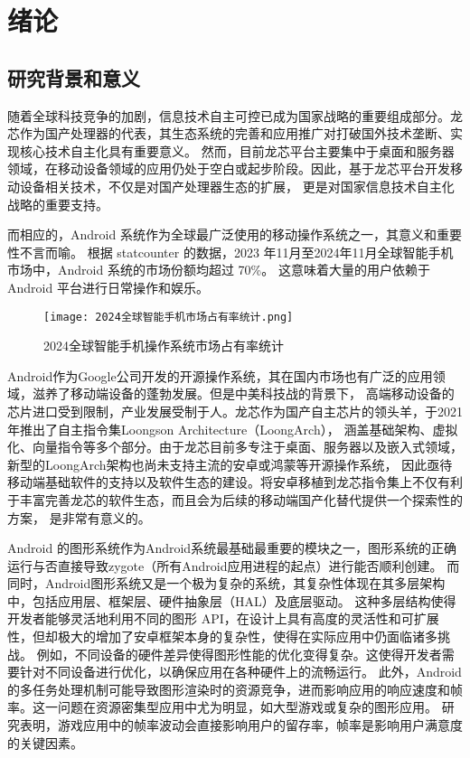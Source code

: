
\chapter{绪论}

\section{研究背景和意义}

随着全球科技竞争的加剧，信息技术自主可控已成为国家战略的重要组成部分。龙芯作为国产处理器的代表，其生态系统的完善和应用推广对打破国外技术垄断、实现核心技术自主化具有重要意义。
然而，目前龙芯平台主要集中于桌面和服务器领域，在移动设备领域的应用仍处于空白或起步阶段。因此，基于龙芯平台开发移动设备相关技术，不仅是对国产处理器生态的扩展，
更是对国家信息技术自主化战略的重要支持。

而相应的，Android 系统作为全球最广泛使用的移动操作系统之一，其意义和重要性不言而喻。
根据 statcounter 的数据，2023 年11月至2024年11月全球智能手机市场中，Android 系统的市场份额均超过 70\%\cite{MobileMarket}。
这意味着大量的用户依赖于 Android 平台进行日常操作和娱乐。
\begin{figure}[h]
    \centering
    \texttt{[image: 2024全球智能手机市场占有率统计.png]}
    \caption{2024全球智能手机操作系统市场占有率统计}\cite{MobileMarket}
  \end{figure}
Android作为Google公司开发的开源操作系统，其在国内市场也有广泛的应用领域，滋养了移动端设备的蓬勃发展。但是中美科技战的背景下，
高端移动设备的芯片进口受到限制，产业发展受制于人。龙芯作为国产自主芯片的领头羊，于2021年推出了自主指令集Loongson Architecture（LoongArch）\cite{Loongarch}，
涵盖基础架构、虚拟化、向量指令等多个部分。由于龙芯目前多专注于桌面、服务器以及嵌入式领域，新型的LoongArch架构也尚未支持主流的安卓或鸿蒙等开源操作系统，
因此亟待移动端基础软件的支持以及软件生态的建设。将安卓移植到龙芯指令集上不仅有利于丰富完善龙芯的软件生态，而且会为后续的移动端国产化替代提供一个探索性的方案，
是非常有意义的。

Android 的图形系统作为Android系统最基础最重要的模块之一，图形系统的正确运行与否直接导致zygote（所有Android应用进程的起点）进行能否顺利创建。
而同时，Android图形系统又是一个极为复杂的系统，其复杂性体现在其多层架构中，包括应用层、框架层、硬件抽象层（HAL）及底层驱动。
这种多层结构使得开发者能够灵活地利用不同的图形 API，在设计上具有高度的灵活性和可扩展性，但却极大的增加了安卓框架本身的复杂性，使得在实际应用中仍面临诸多挑战。
例如，不同设备的硬件差异使得图形性能的优化变得复杂。这使得开发者需要针对不同设备进行优化，以确保应用在各种硬件上的流畅运行。
此外，Android 的多任务处理机制可能导致图形渲染时的资源竞争，进而影响应用的响应速度和帧率。这一问题在资源密集型应用中尤为明显，如大型游戏或复杂的图形应用。
研究表明，游戏应用中的帧率波动会直接影响用户的留存率，帧率是影响用户满意度的关键因素\cite{claypool2006effects}。

